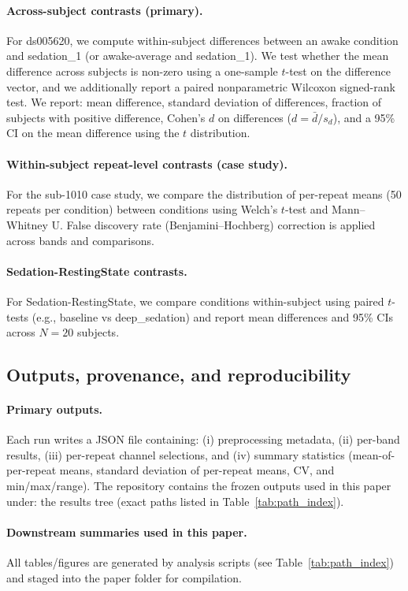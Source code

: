 \documentclass[11pt]{article}
\begin{document}
\paragraph{Across-subject contrasts (primary).}
For ds005620, we compute within-subject differences between an awake condition and sedation\_1 (or awake-average and sedation\_1). We test whether the mean difference across subjects is non-zero using a one-sample $t$-test on the difference vector, and we additionally report a paired nonparametric Wilcoxon signed-rank test. We report:
mean difference, standard deviation of differences, fraction of subjects with positive difference, Cohen's $d$ on differences ($d=\bar{d}/s_d$), and a 95\% CI on the mean difference using the $t$ distribution.

\paragraph{Within-subject repeat-level contrasts (case study).}
For the sub-1010 case study, we compare the distribution of per-repeat means (50 repeats per condition) between conditions using Welch's $t$-test and Mann--Whitney U. False discovery rate (Benjamini--Hochberg) correction is applied across bands and comparisons.

\paragraph{Sedation-RestingState contrasts.}
For Sedation-RestingState, we compare conditions within-subject using paired $t$-tests (e.g., baseline vs deep\_sedation) and report mean differences and 95\% CIs across $N=20$ subjects.

\subsection{Outputs, provenance, and reproducibility}
\paragraph{Primary outputs.}
Each run writes a JSON file containing:
(i) preprocessing metadata, (ii) per-band results, (iii) per-repeat channel selections, and (iv) summary statistics (mean-of-per-repeat means, standard deviation of per-repeat means, CV, and min/max/range). The repository contains the frozen outputs used in this paper under:
the results tree (exact paths listed in Table~\ref{tab:path_index}).

\paragraph{Downstream summaries used in this paper.}
All tables/figures are generated by analysis scripts (see Table~\ref{tab:path_index}) and staged into the paper folder for compilation.
\end{document}
